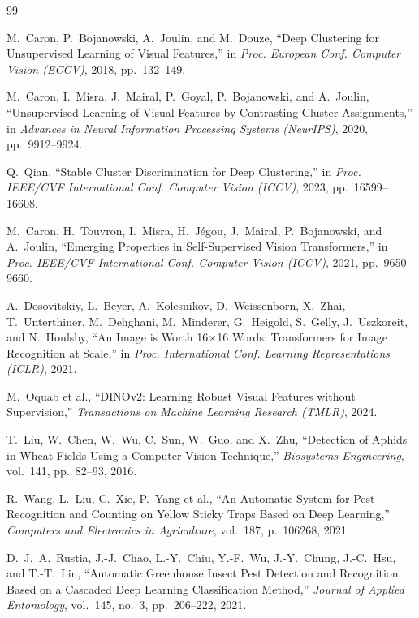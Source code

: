 \documentclass[10pt,a4paper,twocolumn]{article}
\begin{document}
\begin{thebibliography}{99}
\small

M.~Caron, P.~Bojanowski, A.~Joulin, and M.~Douze,
``Deep Clustering for Unsupervised Learning of Visual Features,''
in \emph{Proc. European Conf. Computer Vision (ECCV)}, 2018, pp.~132--149.

M.~Caron, I.~Misra, J.~Mairal, P.~Goyal, P.~Bojanowski, and A.~Joulin,
``Unsupervised Learning of Visual Features by Contrasting Cluster Assignments,''
in \emph{Advances in Neural Information Processing Systems (NeurIPS)}, 2020, pp.~9912--9924.

Q.~Qian,
``Stable Cluster Discrimination for Deep Clustering,''
in \emph{Proc. IEEE/CVF International Conf. Computer Vision (ICCV)}, 2023, pp.~16599--16608.

M.~Caron, H.~Touvron, I.~Misra, H.~J\'egou, J.~Mairal, P.~Bojanowski, and A.~Joulin,
``Emerging Properties in Self-Supervised Vision Transformers,''
in \emph{Proc. IEEE/CVF International Conf. Computer Vision (ICCV)}, 2021, pp.~9650--9660.

A.~Dosovitskiy, L.~Beyer, A.~Kolesnikov, D.~Weissenborn, X.~Zhai, T.~Unterthiner, M.~Dehghani, M.~Minderer, G.~Heigold, S.~Gelly, J.~Uszkoreit, and N.~Houlsby,
``An Image is Worth 16$\times$16 Words: Transformers for Image Recognition at Scale,''
in \emph{Proc. International Conf. Learning Representations (ICLR)}, 2021.

M.~Oquab et al.,
``DINOv2: Learning Robust Visual Features without Supervision,''
\emph{Transactions on Machine Learning Research (TMLR)}, 2024.

T.~Liu, W.~Chen, W.~Wu, C.~Sun, W.~Guo, and X.~Zhu,
``Detection of Aphids in Wheat Fields Using a Computer Vision Technique,''
\emph{Biosystems Engineering}, vol.~141, pp.~82--93, 2016.

R.~Wang, L.~Liu, C.~Xie, P.~Yang et al.,
``An Automatic System for Pest Recognition and Counting on Yellow Sticky Traps Based on Deep Learning,''
\emph{Computers and Electronics in Agriculture}, vol.~187, p.~106268, 2021.

D.~J.~A.~Rustia, J.-J.~Chao, L.-Y.~Chiu, Y.-F.~Wu, J.-Y.~Chung, J.-C.~Hsu, and T.-T.~Lin,
``Automatic Greenhouse Insect Pest Detection and Recognition Based on a Cascaded Deep Learning Classification Method,''
\emph{Journal of Applied Entomology}, vol.~145, no.~3, pp.~206--222, 2021.


\end{thebibliography}
\end{document}
